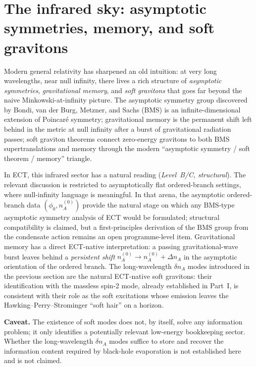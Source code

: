 \documentclass[11pt,a4paper]{article}
\begin{document}
\section{The infrared sky: asymptotic symmetries, memory, and soft gravitons}
\label{sec:pop_ir_soft}

Modern general relativity has sharpened an old intuition: at very
long wavelengths, near null infinity, there lives a rich structure of
\emph{asymptotic symmetries}, \emph{gravitational memory}, and
\emph{soft gravitons} that goes far beyond the naive
Minkowski-at-infinity picture. The asymptotic symmetry group
discovered by Bondi, van der Burg, Metzner, and Sachs (BMS) is an
infinite-dimensional extension of Poincar\'e symmetry; gravitational
memory is the permanent shift left behind in the metric at null
infinity after a burst of gravitational radiation passes; soft
graviton theorems connect zero-energy gravitons to both BMS
supertranslations and memory through the modern ``asymptotic symmetry
/ soft theorem / memory'' triangle.

In ECT, this infrared sector has a natural reading (\emph{Level~B/C,
structural}). The relevant discussion is restricted to asymptotically
flat ordered-branch settings, where null-infinity language is
meaningful. In that arena, the asymptotic ordered-branch data
$(\phi_0, n_A^{(0)})$ provide the natural stage on which any
BMS-type asymptotic symmetry analysis of ECT would be formulated;
structural compatibility is claimed, but a first-principles
derivation of the BMS group from the condensate action remains an
open programme-level item. Gravitational memory has a direct
ECT-native interpretation: a passing gravitational-wave burst leaves
behind a \emph{persistent shift} $n_A^{(0)}\to n_A^{(0)}+\Delta n_A$
in the asymptotic orientation of the ordered branch. The long-wavelength
$\delta n_A$ modes introduced in the previous section are the natural
ECT-native soft gravitons: their identification with the massless
spin-2 mode, already established in Part~I, is consistent with
their role as the soft excitations whose emission leaves the
Hawking--Perry--Strominger ``soft hair'' on a horizon.

\textbf{Caveat.}
The existence of soft modes does not, by itself, solve any
information problem; it only identifies a potentially relevant
low-energy bookkeeping sector. Whether the long-wavelength
$\delta n_A$ modes suffice to store and recover the information
content required by black-hole evaporation is not established here
and is not claimed.
\end{document}
